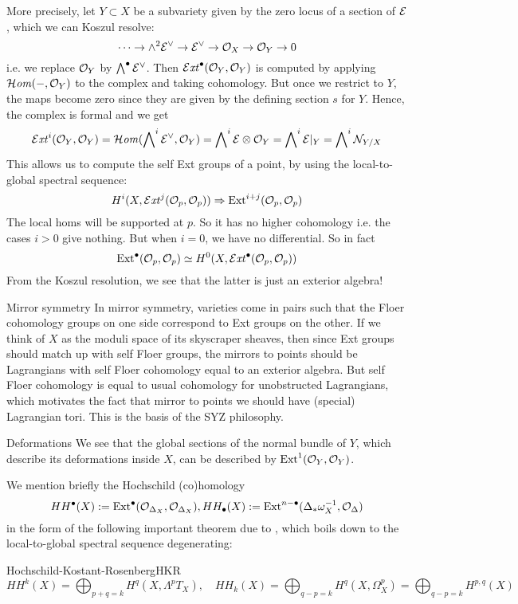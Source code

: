 More precisely, let $Y\subset X$ be a subvariety given by the zero locus of a section of $\mathcal{E}$, which we can Koszul resolve:
\begin{equation*}
    \cdots\to\wedge^2\mathcal{E}^\vee\to\mathcal{E}^\vee\to\mathcal{O}_X\to\mathcal{O}_{Y}\to0
\end{equation*}
i.e. we replace $\mathcal{O}_Y$ by $\bigwedge^\bullet\mathcal{E}^\vee$. Then $\operatorname{\mathcal{E}\mathit{xt}}^\bullet(\mathcal{O}_Y,\mathcal{O}_Y)$ is computed by applying $\operatorname{\mathcal{H}\mathit{om}}(-,\mathcal{O}_Y)$ to the complex and taking cohomology. But once we restrict to $Y$, the maps become zero since they are given by the defining section $s$ for $Y$. Hence, the complex is formal and we get
\begin{equation*}
    \operatorname{\mathcal{E}\mathit{xt}}^i(\mathcal{O}_Y,\mathcal{O}_Y)
        = \operatorname{\mathcal{H}\mathit{om}}(\bigwedge\nolimits^i\mathcal{E}^\vee,\mathcal{O}_Y)
        = \bigwedge\nolimits^i\mathcal{E}\otimes\mathcal{O}_Y
        = \bigwedge\nolimits^i\mathcal{E}|_Y
        = \bigwedge\nolimits^i\mathcal{N}_{Y/X}
\end{equation*}
This allows us to compute the self Ext groups of a point, by using the local-to-global spectral sequence:
\begin{equation*}
    H^i(X,\operatorname{\mathcal{E}\mathit{xt}}^j(\mathcal{O}_p,\mathcal{O}_p)) \Rightarrow \operatorname{Ext}^{i+j}(\mathcal{O}_p,\mathcal{O}_p)
\end{equation*}
The local homs will be supported at $p$. So it has no higher cohomology i.e. the cases $i>0$ give nothing. But when $i=0$, we have no differential. So in fact
\begin{equation*}
    \operatorname{Ext}^\bullet(\mathcal{O}_p,\mathcal{O}_p) \simeq H^0(X,\operatorname{\mathcal{E}\mathit{xt}}^\bullet(\mathcal{O}_p,\mathcal{O}_p))
\end{equation*}
From the Koszul resolution, we see that the latter is just an exterior algebra!

\begin{remark}{Mirror symmetry}{}
    In mirror symmetry, varieties come in pairs such that the Floer cohomology groups on one side correspond to Ext groups on the other. If we think of $X$ as the moduli space of its skyscraper sheaves, then since Ext groups should match up with self Floer groups, the mirrors to points should be Lagrangians with self Floer cohomology equal to an exterior algebra. But self Floer cohomology is equal to usual cohomology for unobstructed Lagrangians, which motivates the fact that mirror to points we should have (special) Lagrangian tori. This is the basis of the SYZ philosophy.
\end{remark}

\begin{remark}{Deformations}{}
    We see that the global sections of the normal bundle of $Y$, which describe its deformations inside $X$, can be described by $\operatorname{Ext}^1(\mathcal{O}_Y,\mathcal{O}_Y)$.
\end{remark}
We mention briefly the Hochschild (co)homology $$HH^\bullet(X):=\operatorname{Ext}^\bullet(\mathcal{O}_{\Delta_X}, \mathcal{O}_{\Delta_X}), HH_\bullet(X):= \operatorname{Ext}^{n-\bullet}(\Delta_* \omega_X ^{-1}, \mathcal{O}_{\Delta})$$ in the form of the following important theorem due to \cite{kontsevich_deformation_2003}, which boils down to the local-to-global spectral sequence degenerating:
\begin{theorem}{Hochschild-Kostant-Rosenberg}{HKR}
    $$HH^k(X)=\bigoplus_{p+q=k} H^q(X, \Lambda^p T_X),\quad HH_k(X)=\bigoplus_{q-p=k} H^q(X, \Omega^p_X)=\bigoplus_{q-p=k} H^{p,q}(X)$$
\end{theorem}

